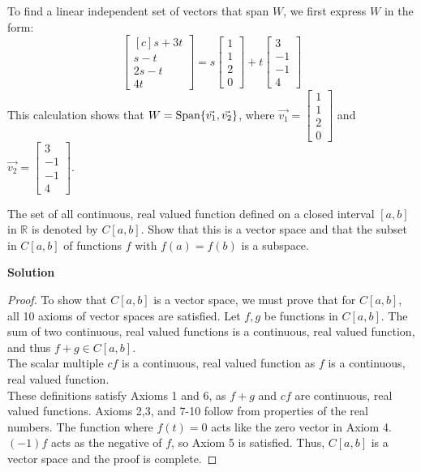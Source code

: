 \documentclass[11pt]{scrartcl}
\theoremstyle{dotlessP}
\theoremstyle{dotlessN}
\DeclarePairedDelimiter\set{\{}{\}}
\newcommand{\reals}{\mathbb{R}} %
\begin{document}
To find a linear independent set of vectors that span $W$, we first express $W$ in the form:
\[
	\begin{bmatrix}[c]
	s + 3t \\
	s - t \\
	2s - t \\
	4t
\end{bmatrix} = 
s 
\begin{bmatrix}
	1 \\
	1 \\
	2 \\
	0
\end{bmatrix} +
t
\begin{bmatrix}
	3 \\
	-1 \\
	-1 \\
	4
\end{bmatrix}
\] 
This calculation shows that $W = \text{Span}\set*{\vec{v_1}, \vec{v_2}}$, where $\vec{v_1} = \begin{bmatrix}
	1 \\
	1 \\
	2 \\
	0
\end{bmatrix}$ and $\vec{v_2} = 
\begin{bmatrix}
	3 \\
	-1 \\
	-1 \\
	4
\end{bmatrix}
$.
\begin{ques}
	The set of all continuous, real valued function defined on a closed interval $[a,b]$ in $\reals$ is denoted by $C[a,b]$. Show that this is a vector space and that the subset in $C[a,b]$ of functions $f$ with $f(a) = f(b)$ is a subspace.
\end{ques}
\textbf{Solution}
\begin{proof}
	To show that $C[a,b]$ is a vector space, we must prove that for $C[a,b]$, all 10 axioms of vector spaces are satisfied. Let $f,g$ be functions in $C[a,b]$. The sum of two continuous, real valued functions is a continuous, real valued function, and thus $f + g \in C[a,b]$. 
	\\

	The scalar multiple  $cf$ is a continuous, real valued function as $f$ is a continuous, real valued function.
\\

	These definitions satisfy Axioms 1 and 6, as $f + g$ and $cf$ are continuous, real valued functions. Axioms 2,3, and 7-10 follow from properties of the real numbers. The function where $f(t) = 0$ acts like the zero vector in Axiom 4. $(-1)f$ acts as the negative of $f$, so Axiom 5 is satisfied. Thus, $C[a,b]$ is a vector space and the proof is complete.
\end{proof}
\end{document}
